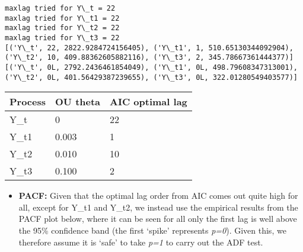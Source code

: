 \documentclass{article}
\providecommand{\tightlist}{%
      \setlength{\itemsep}{0pt}\setlength{\parskip}{0pt}}
\begin{document}
    \begin{Verbatim}[commandchars=\\\{\}]
maxlag tried for Y\_t = 22
maxlag tried for Y\_t1 = 22
maxlag tried for Y\_t2 = 22
maxlag tried for Y\_t3 = 22
[('Y\_t', 22, 2822.9284724156405), ('Y\_t1', 1, 510.65130344092904), ('Y\_t2', 10, 409.88362605882116), ('Y\_t3', 2, 345.78667361444377)]
[('Y\_t', 0L, 2792.2436461854049), ('Y\_t1', 0L, 498.79608347313001), ('Y\_t2', 0L, 401.56429387239655), ('Y\_t3', 0L, 322.01280549403577)]
    \end{Verbatim}

    \begin{longtable}[c]{@{}lll@{}}
\toprule
Process & OU theta & AIC optimal lag\tabularnewline
\midrule
\endhead
Y\_t & 0 & 22\tabularnewline
Y\_t1 & 0.003 & 1\tabularnewline
Y\_t2 & 0.010 & 10\tabularnewline
Y\_t3 & 0.100 & 2\tabularnewline
\bottomrule
\end{longtable}

    \begin{itemize}
\tightlist
\item
  \textbf{PACF:} Given that the optimal lag order from AIC comes out
  quite high for all, except for Y\_t1 and Y\_t2, we instead use the
  empirical results from the PACF plot below, where it can be seen for
  all only the first lag is well above the 95\% confidence band (the
  first `spike' represents \emph{p=0}). Given this, we therefore assume
  it is `safe' to take \emph{p=1} to carry out the ADF test.
\end{itemize}

    
\end{document}
